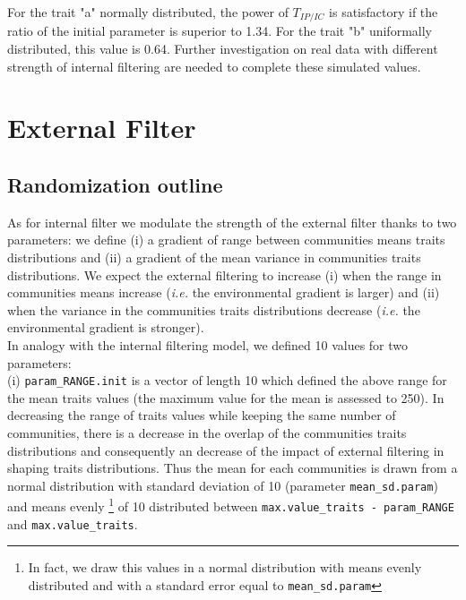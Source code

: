 \documentclass[12pt]{article}\usepackage[]{graphicx}\usepackage[]{color}
\begin{document}
For the trait "a" normally distributed, the power of $T_{IP/IC}$ is satisfactory if the ratio of the initial parameter is superior to
 1.34. For the trait "b" uniformally distributed, this value is 0.64. 
 Further investigation on real data with different strength of internal filtering are needed to complete these simulated values.

 

























\cleardoublepage

\section{External Filter}

 \subsection {Randomization outline}
 
As for internal filter we modulate the strength of the external filter thanks to two parameters:
we define (i) a gradient of range between communities means traits distributions and (ii) a gradient of the mean variance in communities traits distributions. We expect the external filtering to increase (i) when the range in communities means increase (\textit{i.e.} the environmental gradient is larger) and (ii) when the variance in the communities traits distributions decrease (\textit{i.e.} the environmental gradient is stronger).
\\

In analogy with the internal filtering model, we defined 10 values for two parameters:
\\

 (i) \texttt{param\_{}RANGE.init} is a vector of length 10 which defined the above range for the mean traits values (the maximum value for the mean is assessed to 250). In decreasing the range of traits values while keeping the same number of communities, there is a decrease in the overlap of the communities traits distributions and consequently an decrease of the impact of external filtering in shaping traits distributions. Thus the mean for each communities is drawn from a normal distribution with standard deviation of 10 (parameter \texttt{mean\_{}sd.param}) and means evenly
\footnote{In fact, we draw this values in a normal distribution with means evenly distributed and with a standard error equal to \texttt{mean\_{}sd.param}}
of 10 distributed between \texttt{max.value\_{}traits - param\_{}RANGE} and \texttt{max.value\_{}traits}.
\\
\end{document}
